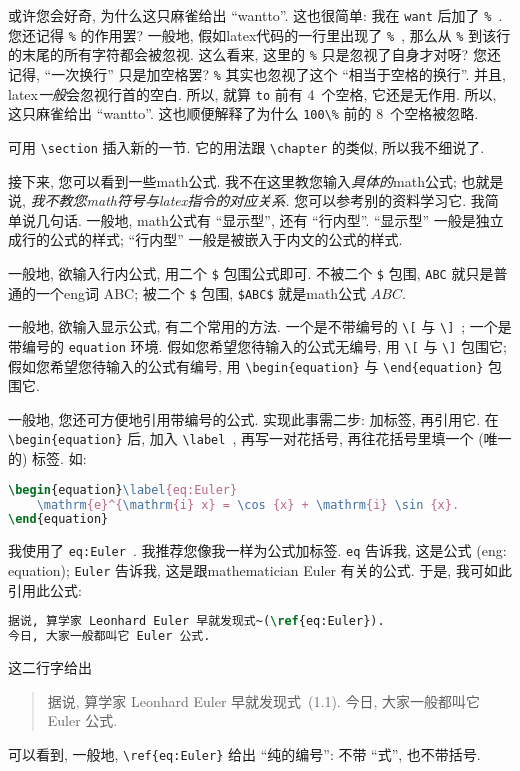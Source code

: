 或许您会好奇, 为什么这只麻雀给出 ``wantto''.
这也很简单: 我在 \verb`want` 后加了 \verb`%`~.
您还记得 \verb`%` 的作用罢?
一般地, 假如\gls{latex}代码的一行里出现了 \verb`%`~,
那么从 \verb`%` 到该行的末尾的所有字符都会被忽视.
这么看来, 这里的 \verb`%` 只是忽视了自身才对呀?
您还记得, ``一次换行'' 只是加空格罢?
\verb`%` 其实也忽视了这个 ``相当于空格的换行''.
并且, \gls{latex}\emph{一般}会忽视行首的空白.
所以, 就算 \verb`to` 前有 4~个空格, 它还是无作用.
所以, 这只麻雀给出 ``wantto''.
这也顺便解释了为什么 \verb`100\%` 前的 8~个空格被忽略.

可用 \verb`\section` 插入新的一节.
它的用法跟 \verb`\chapter` 的类似, 所以我不细说了.

接下来, 您可以看到一些\gls{math}公式.
我不在这里教您输入\emph{具体的}\gls{math}公式;
也就是说,
\emph{我不教您\gls{math}符号与\gls{latex}指令的对应关系.}
您可以参考别的资料学习它.
我简单说几句话.
一般地, \gls{math}公式有 ``显示型'', 还有 ``行内型''.
``显示型'' 一般是独立成行的公式的样式;
``行内型'' 一般是被嵌入于内文的公式的样式.

一般地, 欲输入行内公式,
用二个 \verb`$` 包围公式即可.
不被二个 \verb`$` 包围,
\verb`ABC` 就只是普通的一个\gls{eng}词 ABC;
被二个 \verb`$` 包围,
\verb`$ABC$` 就是\gls{math}公式 $ABC$.

一般地, 欲输入显示公式, 有二个常用的方法.
一个是不带编号的 \verb`\[` 与 \verb`\]`~;
一个是带编号的 \verb`equation` 环境.
假如您希望您待输入的公式无编号,
用 \verb`\[` 与 \verb`\]` 包围它;
假如您希望您待输入的公式有编号,
用 \verb`\begin{equation}` 与 \verb`\end{equation}` 包围它.

一般地, 您还可方便地引用带编号的公式.
实现此事需二步: 加标签, 再引用它.
在 \verb`\begin{equation}` 后, 加入 \verb`\label`~,
再写一对花括号, 再往花括号里填一个 (唯一的) 标签.
如:
\begin{lstlisting}[language=TeX]
\begin{equation}\label{eq:Euler}
    \mathrm{e}^{\mathrm{i} x} = \cos {x} + \mathrm{i} \sin {x}.
\end{equation}
\end{lstlisting}
我使用了 \verb`eq:Euler`~.
我推荐您像我一样为公式加标签.
\verb`eq` 告诉我, 这是公式 (\gls{eng}: equation);
\verb`Euler` 告诉我, 这是跟\gls{mathematician}
Euler 有关的公式.
于是, 我可如此引用此公式:
\begin{lstlisting}[language=TeX]
据说, 算学家 Leonhard Euler 早就发现式~(\ref{eq:Euler}).
今日, 大家一般都叫它 Euler 公式.
\end{lstlisting}
这二行字给出
\begin{quotation}
    据说, 算学家 Leonhard Euler 早就发现式~(1.1).
    今日, 大家一般都叫它 Euler 公式.
\end{quotation}
可以看到, 一般地,
\verb`\ref{eq:Euler}` 给出 ``纯的编号'':
不带 ``式'', 也不带括号.


